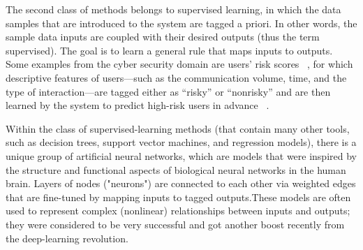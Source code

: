 The second class of methods belongs to supervised learning, in which the data samples
that are introduced to the system are tagged a priori. In other words, the sample data
inputs are coupled with their desired outputs (thus the term supervised). The goal is to
learn a general rule that maps inputs to outputs. Some examples from the cyber security
domain are users’ risk scores ~\cite{Neria:2017:RFM:3055535.2928274}, for which descriptive features
of users—such as the communication volume, time, and the type of interaction—are
tagged either as “risky” or “nonrisky” and are then learned by the system to predict
high-risk users in advance ~\cite{Gruber:2018:UTB:3195275.3195331}.


Within the class of supervised-learning methods (that contain many other tools, such as decision trees, support vector machines, and regression models),
there is a unique group of artificial neural networks, which are models that were inspired by the structure and functional aspects of biological neural networks in the human brain.
Layers of nodes ("neurons") are connected to each other via weighted edges that are fine-tuned by mapping inputs
to tagged outputs.These models are often used to represent complex (nonlinear) relationships between inputs and outputs; 
they were considered to be very successful  and got another boost recently from the deep-learning revolution.


